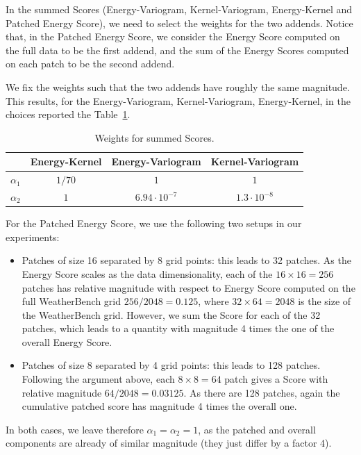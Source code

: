 \documentclass[twoside,11pt]{article}
\begin{document}
	In the summed Scores (Energy-Variogram, Kernel-Variogram, Energy-Kernel and Patched Energy Score), we need to select the weights for the two addends. Notice that, in the Patched Energy Score, we consider the Energy Score computed on the full data to be the first addend, and the sum of the Energy Scores computed on each patch to be the second addend.
	
	We fix the weights such that the two addends have roughly the same magnitude. This results, for the Energy-Variogram, Kernel-Variogram, Energy-Kernel, in the choices reported the Table~\ref{Tab:weights}.
	
	
	
	\begin{table}
		\begin{center}
			\begin{tabular}{lccc}
				\toprule
				&Energy-Kernel & Energy-Variogram & Kernel-Variogram \\
				\midrule
				$ \alpha_1 $ & $ 1/70 $ & $ 1 $& $ 1 $  \\
				$ \alpha_2 $ & $ 1 $ &  $ 6.94 \cdot10^{-7} $&  $ 1.3 \cdot 10^{-8} $ \\
				\bottomrule
			\end{tabular}
		\end{center}
		\caption{Weights for summed Scores.}
		\label{Tab:weights}
	\end{table}
	
	
	For the Patched Energy Score, we use the following two setups in our experiments:
	\begin{itemize}
		\item Patches of size 16 separated by 8 grid points: this leads to 32 patches. As the Energy Score scales as the data dimensionality, each of the $ 16\times16=256 $ patches has relative magnitude with respect to Energy Score computed on the full WeatherBench grid $ 256/2048=0.125 $, where $ 32\times 64=2048 $ is the size of the WeatherBench grid. However, we sum the Score for each of the 32 patches, which leads to a quantity with magnitude 4 times the one of the overall Energy Score.
		\item Patches of size 8 separated by 4 grid points: this leads to 128 patches. Following the argument above, each $ 8\times 8=64  $ patch gives a Score with relative magnitude $ 64/2048=0.03125 $. As there are 128 patches, again the cumulative patched score has magnitude 4 times the overall one.
	\end{itemize}
	
	In both cases, we leave therefore $ \alpha_1=\alpha_2=1 $, as the patched and overall components are already of similar magnitude (they just differ by a factor 4).
	
\end{document}

